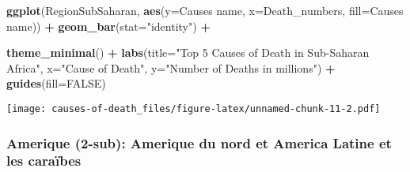 \documentclass[
]{article}
\newenvironment{Shaded}{\begin{snugshade}}{\end{snugshade}}
\newcommand{\AttributeTok}[1]{\textcolor[rgb]{0.13,0.29,0.53}{#1}}
\newcommand{\ConstantTok}[1]{\textcolor[rgb]{0.56,0.35,0.01}{#1}}
\newcommand{\FunctionTok}[1]{\textcolor[rgb]{0.13,0.29,0.53}{\textbf{#1}}}
\newcommand{\NormalTok}[1]{#1}
\newcommand{\SpecialCharTok}[1]{\textcolor[rgb]{0.81,0.36,0.00}{\textbf{#1}}}
\newcommand{\StringTok}[1]{\textcolor[rgb]{0.31,0.60,0.02}{#1}}
\begin{document}
\begin{Shaded}
\begin{Highlighting}[]
\FunctionTok{ggplot}\NormalTok{(RegionSubSaharan, }\FunctionTok{aes}\NormalTok{(}\AttributeTok{y=}\StringTok{\textasciigrave{}}\AttributeTok{Causes name}\StringTok{\textasciigrave{}}\NormalTok{, }\AttributeTok{x=}\NormalTok{Death\_numbers, }\AttributeTok{fill=}\StringTok{\textasciigrave{}}\AttributeTok{Causes name}\StringTok{\textasciigrave{}}\NormalTok{)) }\SpecialCharTok{+}
  \FunctionTok{geom\_bar}\NormalTok{(}\AttributeTok{stat=}\StringTok{"identity"}\NormalTok{) }\SpecialCharTok{+}
 
  \FunctionTok{theme\_minimal}\NormalTok{() }\SpecialCharTok{+} 
  \FunctionTok{labs}\NormalTok{(}\AttributeTok{title=}\StringTok{"Top 5 Causes of Death in Sub{-}Saharan Africa"}\NormalTok{,}
       \AttributeTok{x=}\StringTok{"Cause of Death"}\NormalTok{,}
       \AttributeTok{y=}\StringTok{"Number of Deaths in millions"}\NormalTok{) }\SpecialCharTok{+}
  \FunctionTok{guides}\NormalTok{(}\AttributeTok{fill=}\ConstantTok{FALSE}\NormalTok{)}
\end{Highlighting}
\end{Shaded}

\texttt{[image: causes-of-death\_files/figure-latex/unnamed-chunk-11-2.pdf]}

\hypertarget{amerique-2-sub-amerique-du-nord-et-america-latine-et-les-carauxefbes}{%
\subsubsection{Amerique (2-sub): Amerique du nord et America Latine et
les
caraïbes}\label{amerique-2-sub-amerique-du-nord-et-america-latine-et-les-carauxefbes}}
\end{document}

